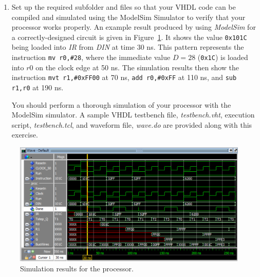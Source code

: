 \documentclass[epsfig,10pt,fullpage]{article}
\begin{document}
\begin{enumerate}
\begin{center}
\begin{minipage}[t]{15 cm}
\begin{lstlisting}[name=proc]
LIBRARY ieee;
USE ieee.std_logic_1164.all;

ENTITY dec3to8 IS
    PORT ( W   : IN   STD_LOGIC_VECTOR(2 DOWNTO 0);
           Y   : OUT  STD_LOGIC_VECTOR(0 TO 7));
END dec3to8;

ARCHITECTURE Behavior OF dec3to8 IS
BEGIN
    PROCESS (W)
    BEGIN
        CASE W IS
            WHEN "000" => Y <= "10000000";
            WHEN "001" => Y <= "01000000";
            WHEN "010" => Y <= "00100000";
            |$\ldots$|
            WHEN "110" => Y <= "00000010";
            WHEN "111" => Y <= "00000001";
            WHEN OTHERS => Y <= "00000000";
        END CASE;
    END PROCESS;
END Behavior;
\end{lstlisting}
\end{minipage}
\end{center}

\begin{center}
Figure 2: Skeleton VHDL code for the processor. (Part $c$)
\end{center}

~\\
\item Set up the required subfolder and files so that your VHDL code can be compiled and 
simulated using the ModelSim Simulator to verify that your processor works properly. 
An example result produced by using {\it ModelSim} for a correctly-designed circuit 
is given in Figure~\ref{fig:fig3}.  It shows the value \texttt{0x101C} being loaded into {\it IR} 
from {\it DIN} at time 30 ns. This pattern represents the instruction \texttt{mv r0,\#28}, 
where the immediate value $D = 28$ (\texttt{0x1C}) is loaded into $r0$ on the clock edge at 50 ns. 
The simulation results then show the instruction \texttt{mvt~r1,\#0xFF00} at 70 ns, 
\texttt{add r0,\#0xFF} at 110 ns, and \texttt{sub r1,r0} at 190 ns.

You should perform a thorough simulation of your processor with the ModelSim simulator. A 
sample VHDL testbench file, {\it testbench.vht}, execution script, {\it testbench.tcl}, 
and waveform file, {\it wave.do} are provided along with this exercise.
\end{enumerate}
\begin{figure}[H]
	\begin{center}
		\includegraphics[scale=.95]{figures/figure3.png}
	\end{center}
	\caption{Simulation results for the processor.}
	\label{fig:fig3}
\end{figure}
\end{document}
